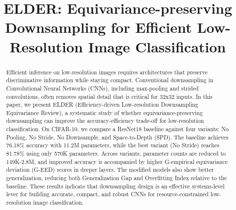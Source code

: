\documentclass[conference]{IEEEtran}
\begin{document}
\title{ELDER: Equivariance-preserving Downsampling for Efficient Low-Resolution Image Classification}

\author{
\and
{}
\and
}

\maketitle

\begin{abstract}
Efficient inference on low-resolution images requires architectures that preserve discriminative information while staying compact. Conventional downsampling in Convolutional Neural Networks (CNNs), including max-pooling and strided convolutions, often removes spatial detail that is critical for 32x32 inputs. In this paper, we present ELDER (Efficiency-driven Low-resolution Downsampling Equivariance Review), a systematic study of whether equivariance-preserving downsampling can improve the accuracy-efficiency trade-off for low-resolution classification. On CIFAR-10, we compare a ResNet18 baseline against four variants: No Pooling, No Stride, No Downsample, and Space-to-Depth (SPD). The baseline achieves 76.18\% accuracy with 11.2M parameters, while the best variant (No Stride) reaches 81.78\% using only 570K parameters. Across variants, parameter counts are reduced to 149K-2.8M, and improved accuracy is accompanied by higher G-empirical equivariance deviation (G-EED) scores in deeper layers. The modified models also show better generalization, reducing both Generalization Gap and Overfitting Index relative to the baseline. These results indicate that downsampling design is an effective systems-level lever for building accurate, compact, and robust CNNs for resource-constrained low-resolution image classification.
\end{abstract}
\end{document}
